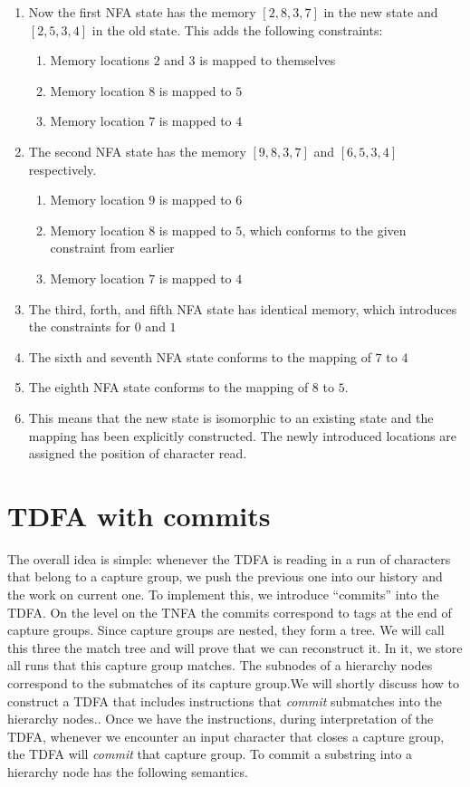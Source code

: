 \documentclass[english]{sigplanconf}
\begin{document}
\begin{enumerate}
\begin{enumerate}
\item Now the first NFA state has the memory $[2,8,3,7]$ in the new state
and $[2,5,3,4]$ in the old state. This adds the following constraints:

\begin{enumerate}
\item Memory locations $2$ and $3$ is mapped to themselves
\item Memory location $8$ is mapped to $5$
\item Memory location $7$ is mapped to $4$
\end{enumerate}
\item The second NFA state has the memory $[9,8,3,7]$ and $[6,5,3,4]$
respectively.

\begin{enumerate}
\item Memory location $9$ is mapped to $6$
\item Memory location $8$ is mapped to $5$, which conforms to the given
constraint from earlier
\item Memory location $7$ is mapped to $4$
\end{enumerate}
\item The third, forth, and fifth NFA state has identical memory, which
introduces the constraints for $0$ and $1$
\item The sixth and seventh NFA state conforms to the mapping of $7$ to
$4$
\item The eighth NFA state conforms to the mapping of $8$ to $5$.
\item This means that the new state is isomorphic to an existing state and
the mapping has been explicitly constructed. The newly introduced
locations are assigned the position of character read.
\end{enumerate}
\end{enumerate}

\section{TDFA with commits\label{sec:TNFA-with-hierarchical}}

The overall idea is simple: whenever the TDFA is reading in a run
of characters that belong to a capture group, we push the previous
one into our history and the work on current one. To implement this,
we introduce ``commits'' into the TDFA. On the level on the TNFA
the commits correspond to tags at the end of capture groups. Since
capture groups are nested, they form a tree. We will call this three
the match tree and will prove that we can reconstruct it. In it, we
store all runs that this capture group matches. The subnodes of a
hierarchy nodes correspond to the submatches of its capture group.We
will shortly discuss how to construct a TDFA that includes instructions
that \emph{commit} submatches into the hierarchy nodes.. Once we have
the instructions, during interpretation of the TDFA, whenever we encounter
an input character that closes a capture group, the TDFA will \emph{commit}
that capture group. To commit a substring into a hierarchy node has
the following semantics.
\end{document}
